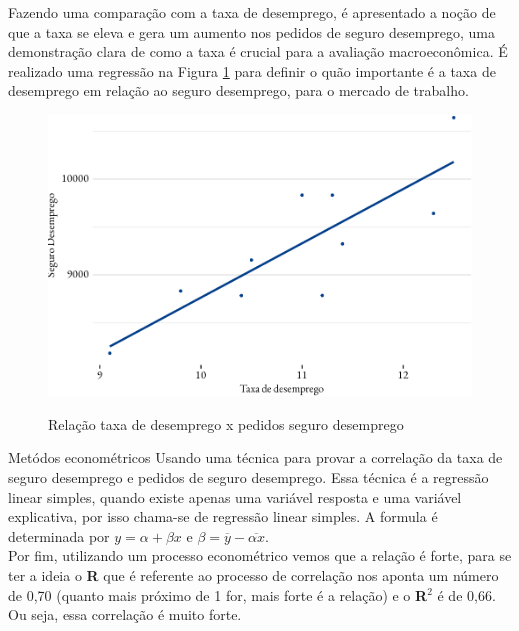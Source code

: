 \par Fazendo uma comparação com a taxa de desemprego, é apresentado a noção de que a taxa se eleva e gera um aumento nos pedidos de seguro desemprego, uma demonstração clara de como a taxa é crucial para a avaliação macroeconômica. É realizado uma regressão na Figura \ref{fig:regressao} para definir o quão importante é a taxa de desemprego em relação ao seguro desemprego, para o mercado de trabalho.

\begin{figure}[h]
	\caption{Relação taxa de desemprego x pedidos seguro desemprego}
	\includegraphics[width=\linewidth]{fig/reg_emprego-2.pdf}
	\label{fig:regressao}
\end{figure}
\begin{smbox}[label={labelbox},nameref={Desigualdade por gênero}]{Metódos econométricos}
	Usando uma técnica para provar a correlação da taxa de seguro desemprego e pedidos de seguro desemprego. Essa técnica é a regressão linear simples, quando existe apenas uma variável resposta e uma variável explicativa, por isso chama-se de regressão linear simples. A formula é determinada por $y = \alpha + \beta x$ e $\beta = \overline{y} - \overline{\alpha x}$.
	\\
	Por fim, utilizando um processo econométrico vemos que a relação é forte, para se ter a ideia o \textbf{R} que é referente ao processo de correlação nos aponta um número de 0,70 (quanto mais próximo de 1 for, mais forte é a relação) e o \textbf{R}$^{2}$ é de 0,66. Ou seja, essa correlação é muito forte.
\end{smbox}



